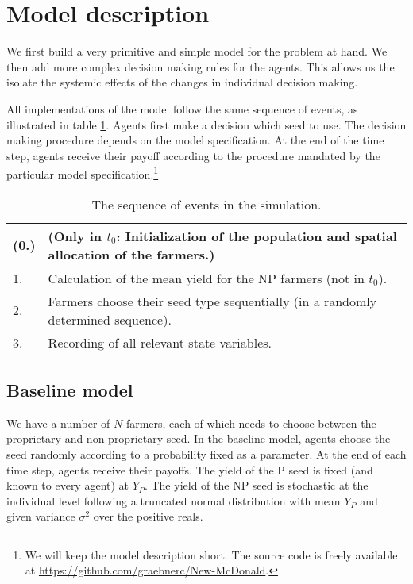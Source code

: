 \documentclass[11pt,a4paper]{article}
\author{Claudius Gr\"abner}
\begin{document}
\section{Model description}
We first build a very primitive and simple model for the problem at hand.
We then add more complex decision making rules for the agents. 
This allows us the isolate the systemic effects of the changes in individual decision making.

All implementations of the model follow the same sequence of events, as illustrated in table \ref{tab:procedure}.
Agents first make a decision which seed to use. The decision making procedure depends on the model specification.
At the end of the time step, agents receive their payoff according to the procedure mandated by the particular model specification.\footnote{We will keep the model description short. 
The source code is freely available at \href{https://github.com/graebnerc/New-McDonald}{https://github.com/graebnerc/New-McDonald}.}

\begin{table}
\begin{center}
\begin{tabular}{ll}
\toprule
(0.) & (Only in $t_0$: Initialization of the population and spatial allocation of the farmers.)\\\midrule
1. & Calculation of the mean yield for the NP farmers (not in $t_0$).\\\midrule
2. & Farmers choose their seed type sequentially (in a randomly determined sequence).\\\midrule
3. & Recording of all relevant state variables.\\\bottomrule
\end{tabular}
\caption{The sequence of events in the simulation.}\label{tab:procedure}
\end{center}
\end{table}


\subsection{Baseline model}
We have a number of $N$ farmers, each of which needs to choose between the proprietary and non-proprietary seed. 
In the baseline model, agents choose the seed randomly according to a probability fixed as a parameter.
At the end of each time step, agents receive their payoffs.
The yield of the P seed is fixed (and known to every agent) at $Y_P$.
The yield of the NP seed is stochastic at the individual level following a truncated normal distribution with mean $Y_P$ and given variance $\sigma^2$ over the positive reals.
\end{document}
